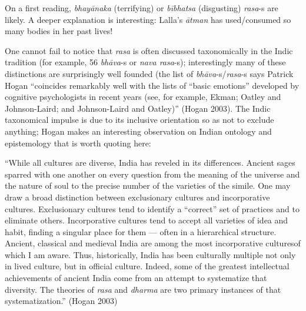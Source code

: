 On a first reading, \textsl{bhayānaka} (terrifying) or \textsl{bībhatsa} (disgusting) \textsl{rasa}-s are likely. A deeper explanation is interesting: Lalla’s \textsl{ātman} has used/consumed so many bodies in her past lives!

One cannot fail to notice that \textsl{rasa} is often discussed taxonomically in the Indic tradition (for example, 56 \textsl{bhāva}-s or \textsl{nava rasa}-s); interestingly many of these distinctions are surprisingly well founded (the list of \textsl{bhāva}-s/\textsl{rasa}-s says Patrick Hogan “coincides remarkably well with the lists of “basic emotions” developed by cognitive psychologists in recent years (see, for example, Ekman; Oatley and Johnson-Laird; and Johnson-Laird and Oatley)” (Hogan 2003). The Indic taxonomical impulse is due to its inclusive orientation so as not to exclude anything; Hogan makes an interesting observation on Indian ontology and epistemology that is worth quoting here:

\begin{myquote}
“While all cultures are diverse, India has reveled in its differences. Ancient sages sparred with one another on every question from the meaning of the universe and the nature of soul to the precise number of the varieties of the simile. One may draw a broad distinction between exclusionary cultures and incorporative cultures. Exclusionary cultures tend to identify a “correct” set of practices and to eliminate others. Incorporative cultures tend to accept all varieties of idea and habit, finding a singular place for them — often in a hierarchical structure. Ancient, classical and medieval India are among the most incorporative culturesof which I am aware. Thus, historically, India has been culturally multiple not only in lived culture, but in official culture. Indeed, some of the greatest intellectual achievements of ancient India come from an attempt to systematize that diversity. The theories of \textsl{rasa} and \textsl{dharma} are two primary instances of that systematization.”  
\hfill(Hogan 2003)
\end{myquote}

